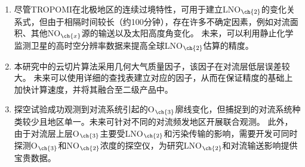 \begin{enumerate}[label=（\arabic*）, labelindent=\parindent, nosep, leftmargin=0pt, widest=0, itemindent=*, topsep=0pt, partopsep=0pt, parsep=0pt]

\item 尽管TROPOMI在北极地区的连续过境特性，可用于建立LNO$_{\ch{2}}$的变化关系式，但由于相隔时间较长（约100分钟），存在许多不确定因素，例如对流面积、其他NO$_{\ch{x}}$源的输送以及太阳高度角变化。
未来，可以利用静止化学监测卫星的高时空分辨率数据来提高全球LNO$_{\ch{2}}$估算的精度。


\item 本研究中的云切片算法采用几何大气质量因子，该因子在对流层低层误差较大。
未来可以使用详细的查找表建立对应的因子，从而在保证精度的基础上加快计算速度，并将其融合至二级产品中。

\item 探空试验成功观测到对流系统引起的O$_{\ch{3}}$廓线变化，但捕捉到的对流系统种类较少且地区单一。未来可针对不同的对流频发地区开展联合观测。
此外，由于对流层上层O$_{\ch{3}}$主要受LNO$_{\ch{2}}$和污染传输的影响，需要开发可同时探测O$_{\ch{3}}$和NO$_{\ch{2}}$浓度的探空仪，为研究LNO$_{\ch{2}}$和对流输送影响提供宝贵数据。

\end{enumerate}

